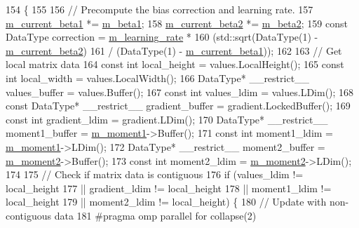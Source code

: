 \begin{DoxyCode}
154                                                                       \{
155 
156   \textcolor{comment}{// Precompute the bias correction and learning rate.}
157   \hyperlink{classlbann_1_1adam_a53c3034e187da2720447bbb4f2b59a5d}{m\_current\_beta1} *= \hyperlink{classlbann_1_1adam_a73af15a28066edbfad9ba6a900746a19}{m\_beta1};
158   \hyperlink{classlbann_1_1adam_ad38376b684d69d4a15da1d11f8808ca7}{m\_current\_beta2} *= \hyperlink{classlbann_1_1adam_ab1f2a16b8eb7e265895ea9eef3fe87b2}{m\_beta2};
159   \textcolor{keyword}{const} DataType correction = \hyperlink{classlbann_1_1optimizer_ad393dcdcb82b44510c586ed5ec46d4dd}{m\_learning\_rate} *
160                               (std::sqrt(DataType(1) - \hyperlink{classlbann_1_1adam_ad38376b684d69d4a15da1d11f8808ca7}{m\_current\_beta2})
161                                / (DataType(1) - \hyperlink{classlbann_1_1adam_a53c3034e187da2720447bbb4f2b59a5d}{m\_current\_beta1}));
162 
163   \textcolor{comment}{// Get local matrix data}
164   \textcolor{keyword}{const} \textcolor{keywordtype}{int} local\_height = values.LocalHeight();
165   \textcolor{keyword}{const} \textcolor{keywordtype}{int} local\_width = values.LocalWidth();
166   DataType* \_\_restrict\_\_ values\_buffer = values.Buffer();
167   \textcolor{keyword}{const} \textcolor{keywordtype}{int} values\_ldim = values.LDim();
168   \textcolor{keyword}{const} DataType* \_\_restrict\_\_ gradient\_buffer = gradient.LockedBuffer();
169   \textcolor{keyword}{const} \textcolor{keywordtype}{int} gradient\_ldim = gradient.LDim();
170   DataType* \_\_restrict\_\_ moment1\_buffer = \hyperlink{classlbann_1_1adam_aa10a518a5356257bc69e655b88b0ed67}{m\_moment1}->Buffer();
171   \textcolor{keyword}{const} \textcolor{keywordtype}{int} moment1\_ldim = \hyperlink{classlbann_1_1adam_aa10a518a5356257bc69e655b88b0ed67}{m\_moment1}->LDim();
172   DataType* \_\_restrict\_\_ moment2\_buffer = \hyperlink{classlbann_1_1adam_aea3295a0ee7da5e9c56fd6ff2f05c63f}{m\_moment2}->Buffer();
173   \textcolor{keyword}{const} \textcolor{keywordtype}{int} moment2\_ldim = \hyperlink{classlbann_1_1adam_aea3295a0ee7da5e9c56fd6ff2f05c63f}{m\_moment2}->LDim();
174 
175   \textcolor{comment}{// Check if matrix data is contiguous}
176   \textcolor{keywordflow}{if} (values\_ldim != local\_height
177       || gradient\_ldim != local\_height
178       || moment1\_ldim != local\_height
179       || moment2\_ldim != local\_height) \{
180     \textcolor{comment}{// Update with non-contiguous data}
181 \textcolor{preprocessor}{    #pragma omp parallel for collapse(2)}

\end{DoxyCode}
